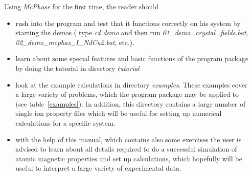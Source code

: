 \documentclass[twoside]{article}
\newcommand{\prg}{\sl}
\begin{document}
Using {\prg McPhase} for the first time, the reader should
\begin{itemize}
\item
rush into the program and test that it functions correctly on his system
by starting the demos ( type {\prg cd demo} and then run {\prg 01\_demo\_crystal\_fields.bat},{\prg %
02\_demo\_mcphas\_I\_NdCu2.bat}, etc.).  
\item 
learn about some special features and basic functions of the program package by
doing the tutorial in directory {\prg tutorial}
\item
look at the example calculations in directory {\prg examples}. These examples cover a large variety
of problems, which the program package may be applied to (see table~\ref{examples}). In addition, this directory
contains a large number of single ion property files which will be useful for setting
up numerical calculations for a specific system.
\item
with the help of this manual, which contains also some exercises the user is advised 
to learn about all details required to do a successful simulation of atomic magnetic properties
and set up calculations, which hopefully will be useful to interpret a large variety of 
experimental data. 
\end{itemize}
\end{document}
